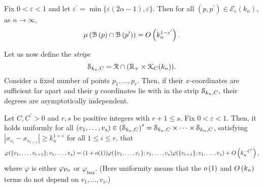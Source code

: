 \begin{lemma}\label{cor:expected_common_neighbours_KPKVB}
Fix $0 < \varepsilon < 1$ and let $\varepsilon^\prime = \min\{\varepsilon(2\alpha - 1),\varepsilon\}$. Then for all $(p,p^\prime) \in \mathcal{E}_\varepsilon(k_n)$, as $n \to \infty$,
\[
	\mu\left({\mathcal B}\left(p\right) \cap {\mathcal B}\left(p^\prime\right)\right) = O\left(k_n^{1-\varepsilon^\prime}\right).
\] 
\end{lemma}

Let us now define the \emph{stripe}
\begin{equation}\label{eq:def_stripe}
	\mathcal{S}_{k_n,C} = {\mathcal R} \cap ({\mathbb R}_+ \times {\mathcal K}_C(k_n)).
\end{equation} 
Consider a fixed number of points $p_1, \dots, p_r$. Then, if their $x$-coordinates are sufficient far apart and their $y$ coordinates lie with in the strip $\mathcal{S}_{k_n,C}$, their degrees are asymptotically independent.

\begin{lemma}\label{lem:probdegFact}
Let $C, C^\prime>0$ and $r,s$ be positive integers with $r+1\leq s$. Fix $0<\varepsilon<1$. Then, it holds uniformly for all $(v_1,\dots,v_s) \in \left(\mathcal{S}_{k_n,C}\right)^{s} = \mathcal{S}_{k_n,C} \times \dots \times \mathcal{S}_{k_n,C}$, satisfying $|x_{v_i}-x_{v_{r+1}}|\geq k_n^{1+\varepsilon}$ for all  $1\leq i \leq r$,  that
\[
	\varphi(\{v_1,\dots,v_{r+1}\};v_1,\dots,v_s)
	=(1+o(1))\varphi(\{v_1,\dots,v_r\};v_1,\dots,v_s)\varphi(\{v_{r+1}\};v_1,\dots,v_s)+O\left(k_n^{-C^\prime}\right),
\]
where $\varphi$ is either $\varphi_{{\mathrm{Po}}}$ or $\varphi_{\mathrm{box}}$.
(Here uniformity means that the $o\left(1\right)$ and $O\left(k_n\right)$ terms do not depend on $v_1,\dots,v_{s}$.)
\end{lemma}

